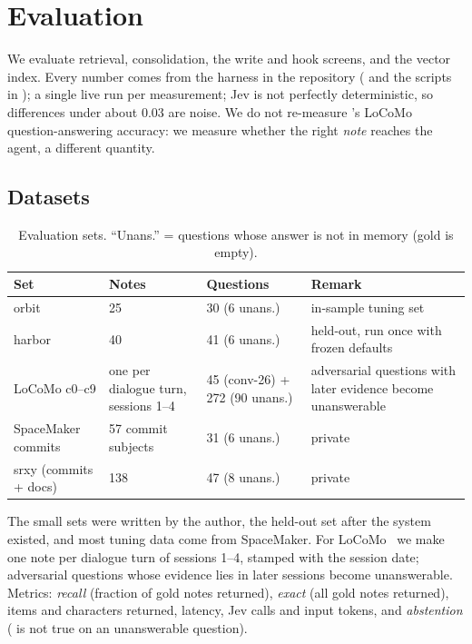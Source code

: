 \section{Evaluation}
\label{sec:eval}

We evaluate retrieval, consolidation, the write and hook screens, and the vector index. Every number comes from the harness in the repository ( and the scripts in ); a single live run per measurement; Jev is not perfectly deterministic, so differences under about 0.03 are noise. We do not re-measure \jevmempaper's LoCoMo question-answering accuracy: we measure whether the right \emph{note} reaches the agent, a different quantity.

\subsection{Datasets}

\begin{table}[t]
\caption{Evaluation sets. ``Unans.'' = questions whose answer is not in memory (gold is empty).}
\label{tab:data}
\small
\begin{tabular}{@{}llll@{}}
\toprule
Set & Notes & Questions & Remark \\
\midrule
orbit & 25 & 30 (6 unans.) & in-sample tuning set \\
harbor & 40 & 41 (6 unans.) & held-out, run once with frozen defaults \\
LoCoMo c0--c9 & one per dialogue turn, sessions 1--4 & 45 (conv-26) + 272 (90 unans.) & adversarial questions with later evidence become unanswerable \\
SpaceMaker commits & 57 commit subjects & 31 (6 unans.) & private \\
srxy (commits + docs) & 138 & 47 (8 unans.) & private \\
\bottomrule
\end{tabular}
\end{table}

The small sets were written by the author, the held-out set after the system existed, and most tuning data come from SpaceMaker. For LoCoMo~\cite{maharana2024locomo} we make one note per dialogue turn of sessions 1--4, stamped with the session date; adversarial questions whose evidence lies in later sessions become unanswerable. Metrics: \emph{recall} (fraction of gold notes returned), \emph{exact} (all gold notes returned), items and characters returned, latency, Jev calls and input tokens, and \emph{abstention} ( is not true on an unanswerable question).

